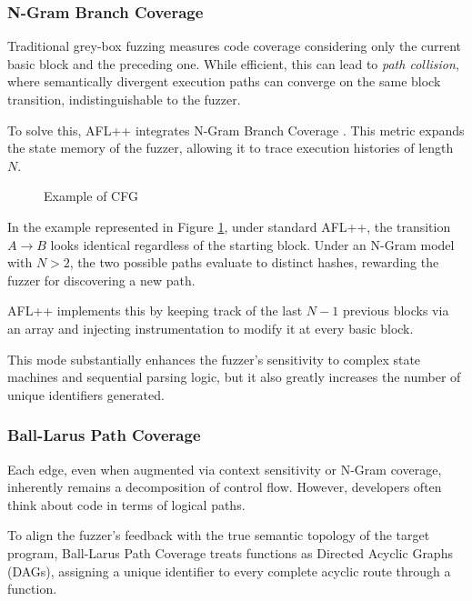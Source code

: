 \subsubsection{N-Gram Branch Coverage}

Traditional grey-box fuzzing measures code coverage considering only the current basic block and the preceding one. While efficient, this can lead to \textit{path collision}, where semantically divergent execution paths can converge on the same block transition, indistinguishable to the fuzzer.

To solve this, AFL++ integrates N-Gram Branch Coverage \cite{wang2019sensitive}. This metric expands the state memory of the fuzzer, allowing it to trace execution histories of length $N$.

\begin{figure}
    \centering
    \resizebox{0.5\textwidth}{!}{
        
    }
    \caption{Example of CFG}
    \label{fig:cfgex1}
\end{figure}

In the example represented in Figure \ref{fig:cfgex1}, under standard AFL++, the transition $A \rightarrow B$ looks identical regardless of the starting block. Under an N-Gram model with $N > 2$, the two possible paths evaluate to distinct hashes, rewarding the fuzzer for discovering a new path.

AFL++ implements this by keeping track of the last $N-1$ previous blocks via an array and injecting instrumentation to modify it at every basic block.

This mode substantially enhances the fuzzer's sensitivity to complex state machines and sequential parsing logic, but it also greatly increases the number of unique identifiers generated.

\subsubsection{Ball-Larus Path Coverage}

Each edge, even when augmented via context sensitivity or N-Gram coverage, inherently remains a decomposition of control flow. However, developers often think about code in terms of logical paths. 

To align the fuzzer's feedback with the true semantic topology of the target program, Ball-Larus Path Coverage treats functions as Directed Acyclic Graphs (DAGs), assigning a unique identifier to every complete acyclic route through a function. 

